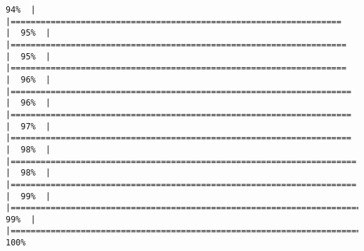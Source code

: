 \documentclass[
]{article}
\begin{document}
\begin{verbatim}
94%  |                                                                              |==================================================================    |  95%  |                                                                              |===================================================================   |  95%  |                                                                              |===================================================================   |  96%  |                                                                              |====================================================================  |  96%  |                                                                              |====================================================================  |  97%  |                                                                              |====================================================================  |  98%  |                                                                              |===================================================================== |  98%  |                                                                              |===================================================================== |  99%  |                                                                              |======================================================================|  99%  |                                                                              |======================================================================| 100%
\end{verbatim}
\end{document}
